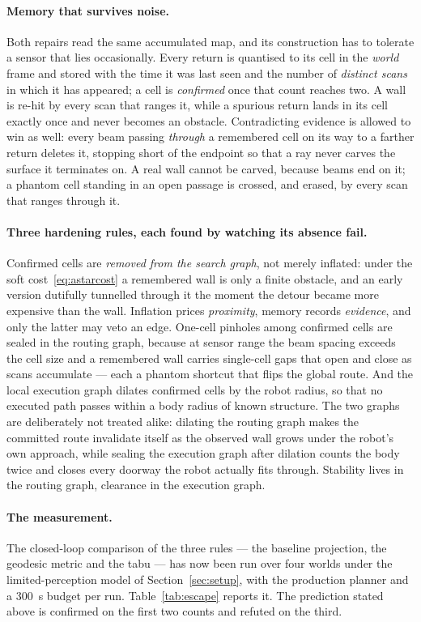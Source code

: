 \documentclass[11pt,a4paper]{article}
\begin{document}
\paragraph{Memory that survives noise.} Both repairs read the same accumulated map, and its construction has
to tolerate a sensor that lies occasionally. Every return is quantised to its cell in the \emph{world} frame
and stored with the time it was last seen and the number of \emph{distinct scans} in which it has appeared; a
cell is \emph{confirmed} once that count reaches two. A wall is re-hit by every scan that ranges it, while a
spurious return lands in its cell exactly once and never becomes an obstacle. Contradicting evidence is
allowed to win as well: every beam passing \emph{through} a remembered cell on its way to a farther return
deletes it, stopping short of the endpoint so that a ray never carves the surface it terminates on. A real
wall cannot be carved, because beams end on it; a phantom cell standing in an open passage is crossed, and
erased, by every scan that ranges through it.

\paragraph{Three hardening rules, each found by watching its absence fail.} Confirmed cells are
\emph{removed from the search graph}, not merely inflated: under the soft cost~\eqref{eq:astarcost} a
remembered wall is only a finite obstacle, and an early version dutifully tunnelled through it the moment the
detour became more expensive than the wall. Inflation prices \emph{proximity}, memory records
\emph{evidence}, and only the latter may veto an edge. One-cell pinholes among confirmed cells are sealed in
the routing graph, because at sensor range the beam spacing exceeds the cell size and a remembered wall
carries single-cell gaps that open and close as scans accumulate --- each a phantom shortcut that flips the
global route. And the local execution graph dilates confirmed cells by the robot radius, so that no executed
path passes within a body radius of known structure. The two graphs are deliberately not treated alike:
dilating the routing graph makes the committed route invalidate itself as the observed wall grows under the
robot's own approach, while sealing the execution graph after dilation counts the body twice and closes every
doorway the robot actually fits through. Stability lives in the routing graph, clearance in the execution
graph.

\paragraph{The measurement.} The closed-loop comparison of the three rules --- the baseline projection, the
geodesic metric and the tabu --- has now been run over four worlds under the limited-perception model of
Section~\ref{sec:setup}, with the production planner and a $300$~s budget per run. Table~\ref{tab:escape}
reports it. The prediction stated above is confirmed on the first two counts and refuted on the third.
\end{document}
